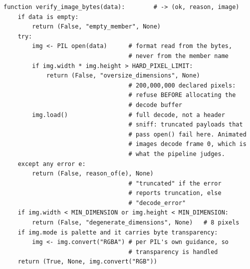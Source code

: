 \documentclass{article} %
\begin{document}
{\footnotesize\begin{verbatim}
function verify_image_bytes(data):        # -> (ok, reason, image)
    if data is empty:
        return (False, "empty_member", None)
    try:
        img <- PIL open(data)      # format read from the bytes,
                                   # never from the member name
        if img.width * img.height > HARD_PIXEL_LIMIT:
            return (False, "oversize_dimensions", None)
                                   # 200,000,000 declared pixels:
                                   # refuse BEFORE allocating the
                                   # decode buffer
        img.load()                 # full decode, not a header
                                   # sniff: truncated payloads that
                                   # pass open() fail here. Animated
                                   # images decode frame 0, which is
                                   # what the pipeline judges.
    except any error e:
        return (False, reason_of(e), None)
                                   # "truncated" if the error
                                   # reports truncation, else
                                   # "decode_error"
    if img.width < MIN_DIMENSION or img.height < MIN_DIMENSION:
        return (False, "degenerate_dimensions", None)   # 8 pixels
    if img.mode is palette and it carries byte transparency:
        img <- img.convert("RGBA") # per PIL's own guidance, so
                                   # transparency is handled
    return (True, None, img.convert("RGB"))
\end{verbatim}}
\end{document}

